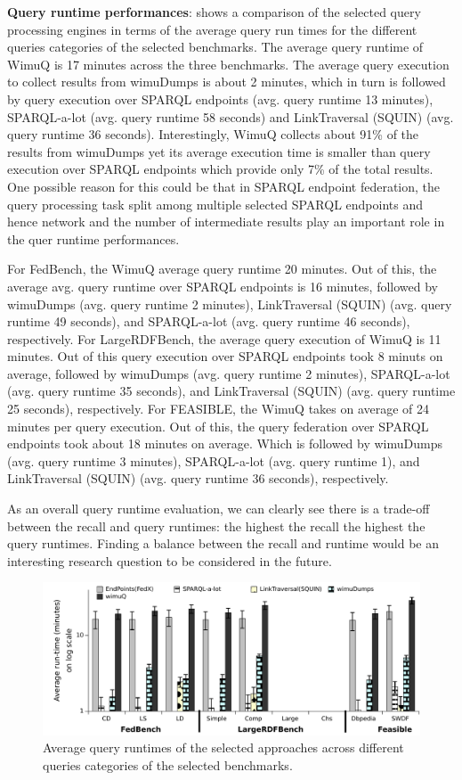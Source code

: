 \textbf{Query runtime performances}: 
 shows a comparison of the selected query processing engines in terms of the average query run times for the different queries categories of the selected benchmarks. The average query runtime of WimuQ is 17 minutes across the three benchmarks. The average query execution to collect results from wimuDumps is about 2 minutes, which in turn is followed by query execution over SPARQL endpoints (avg. query runtime 13 minutes), SPARQL-a-lot (avg. query runtime 58 seconds) and LinkTraversal (SQUIN) (avg. query runtime 36 seconds). Interestingly, WimuQ collects about 91\% of the results from wimuDumps yet its average execution time is smaller than query execution over SPARQL endpoints which provide only 7\%  of the total results. One possible reason for this could be that in SPARQL endpoint federation, the query processing task split among multiple selected SPARQL endpoints and hence network and the number of intermediate results play an important role in the quer runtime performances. 

For FedBench, the WimuQ average query runtime 20 minutes. Out of this, the average avg. query runtime over SPARQL endpoints is 16 minutes, followed by wimuDumps (avg. query runtime 2 minutes), LinkTraversal (SQUIN) (avg. query runtime 49 seconds), and SPARQL-a-lot (avg. query runtime 46 seconds), respectively. For LargeRDFBench, the average query execution of WimuQ is 11 minutes. Out of this query execution over SPARQL endpoints took 8 minuts on average, followed by wimuDumps (avg. query runtime 2 minutes), SPARQL-a-lot (avg. query runtime 35 seconds), and LinkTraversal (SQUIN) (avg. query runtime 25 seconds), respectively. For FEASIBLE, the WimuQ takes on average of 24 minutes per query execution. Out of this, the query federation over SPARQL endpoints took about 18 minutes on average. Which is followed by wimuDumps (avg. query runtime 3 minutes), SPARQL-a-lot (avg. query runtime 1), and LinkTraversal (SQUIN) (avg. query runtime 36 seconds), respectively.

As an overall query runtime evaluation, we can clearly see there is a trade-off between the recall and query runtimes: the highest the recall the highest the query runtimes. Finding a balance between the recall and runtime would be an interesting research question to be considered in the future.  

\begin{figure}[htb]
    \includegraphics[width=\linewidth]{img/runtime1Min.pdf}
	\caption{Average query runtimes of the selected approaches across different queries categories of the selected benchmarks.}
	\label{fig:runtime1}
\end{figure}

